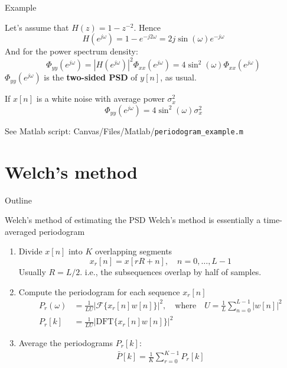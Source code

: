 \documentclass[10pt]{beamer}
\begin{document}
\begin{frame}{Example}

\begin{center}
\end{center}

Let's assume that $H(z) = 1 - z^{-2}$. Hence
\begin{equation*}
	H(e^{j\omega}) = 1 - e^{-j2\omega} = 2j\sin(\omega)e^{-j\omega}
\end{equation*}
And for the power spectrum density:
\begin{equation*}
	\Phi_{yy}(e^{j\omega}) = |H(e^{j\omega})|^2\Phi_{xx}(e^{j\omega}) = 4\sin^2(\omega)\Phi_{xx}(e^{j\omega})
\end{equation*}
$\Phi_{yy}(e^{j\omega})$ is the \textbf{two-sided PSD} of $y[n]$, as usual.
\vspace{0.25cm}

If $x[n]$ is a white noise with average power $\sigma_x^2$
\begin{equation*}
\Phi_{yy}(e^{j\omega}) = 4\sin^2(\omega)\sigma_x^2
\end{equation*}

See Matlab script: Canvas/Files/Matlab/\texttt{periodogram\_example.m}
\end{frame}

\section{Welch's method}
\begin{frame}{Outline}
\tableofcontents[currentsection]
\end{frame}
\begin{frame}{Welch's method of estimating the PSD}
	Welch's method is essentially a time-averaged periodogram
	
	\begin{enumerate}
	\item Divide $x[n]$ into $K$ overlapping segments
		\begin{equation*}
			x_r[n] = x[rR + n], \quad n = 0, \ldots, L-1
		\end{equation*}
		Usually $R = L/2$. i.e., the subsequences overlap by half of samples.
	\item Compute the periodogram for each sequence $x_r[n]$
		\begin{align*}
			P_r(\omega) &= \frac{1}{LU}|\mathcal{F}\{x_r[n]w[n]\}|^2, \quad\text{where}\quad U = \frac{1}{L}\sum_{n = 0}^{L-1}|w[n]|^2 \\
			P_r[k] &= \frac{1}{LU}|\mathrm{DFT}\{x_r[n]w[n]\}|^2
		\end{align*}
	\item Average the periodograms $P_r[k]$:
		\begin{align*}
			\bar{P}[k] = \frac{1}{K}\sum_{r = 0}^{K-1}P_r[k]
		\end{align*}
	\end{enumerate}
\end{frame}
\end{document}
